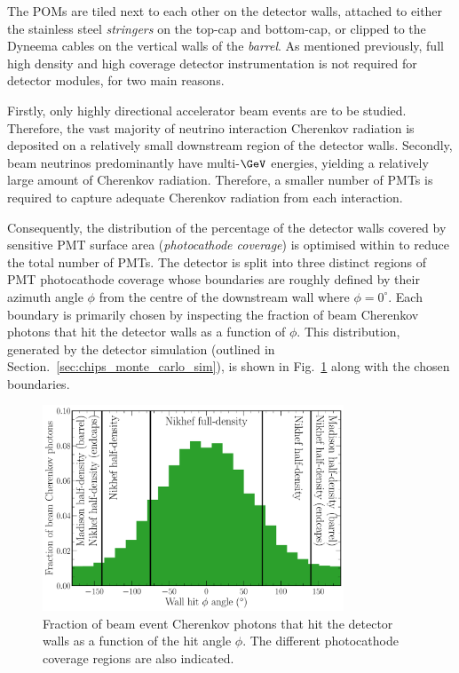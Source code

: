 The POMs are tiled next to each other on the detector walls, attached to either the stainless
steel \emph{stringers} on the top-cap and bottom-cap, or clipped to the Dyneema cables on the
vertical walls of the \emph{barrel}. As mentioned previously, full high density and high coverage
detector instrumentation is not required for \chips detector modules, for two main reasons.

Firstly, only highly directional accelerator beam events are to be studied. Therefore, the vast
majority of neutrino interaction Cherenkov radiation is deposited on a relatively small downstream
region of the detector walls. Secondly, beam neutrinos predominantly have multi-$\GeV$ energies,
yielding a relatively large amount of Cherenkov radiation. Therefore, a smaller number of PMTs is
required to capture adequate Cherenkov radiation from each interaction.

Consequently, the distribution of the percentage of the detector walls covered by sensitive PMT
surface area (\emph{photocathode coverage}) is optimised within \chipsfive to reduce the total
number of PMTs. The detector is split into three distinct regions of PMT photocathode coverage
whose boundaries are roughly defined by their azimuth angle $\phi$ from the centre of the
downstream wall where $\phi=0^{\circ}$. Each boundary is primarily chosen by inspecting the
fraction of beam Cherenkov photons that hit the detector walls as a function of $\phi$. This
distribution, generated by the detector simulation (outlined in
Section.~\ref{sec:chips_monte_carlo_sim}), is shown in Fig.~\ref{fig:coverage} along with the
chosen boundaries.

\begin{figure} %
    \includegraphics[width=0.8\textwidth]{diagrams/4-chips/coverage.pdf}
    \caption[Fraction of beam event Cherenkov photons that hit the detector walls as a function of
        the hit angle] {Fraction of beam event Cherenkov photons that hit the detector walls as a
        function of the hit angle $\phi$. The different photocathode coverage regions are also
        indicated.}
    \label{fig:coverage}
\end{figure}

